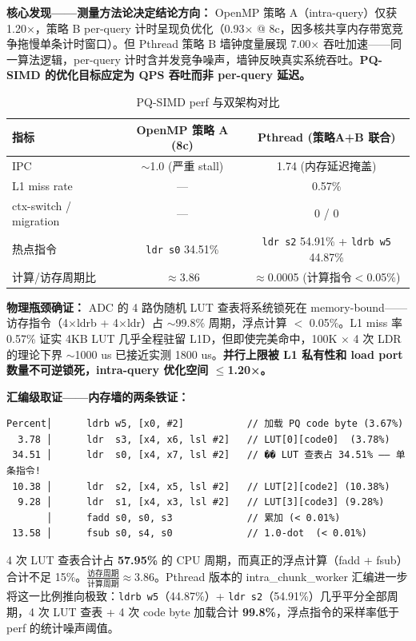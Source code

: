 \documentclass[UTF8,a4paper,10pt]{ctexart}
\begin{document}
\textbf{核心发现——测量方法论决定结论方向：} OpenMP 策略 A（intra-query）仅获 1.20×，策略 B per-query 计时呈现负优化（0.93× @ 8c，因多核共享内存带宽竞争拖慢单条计时窗口）。但 Pthread 策略 B 墙钟度量展现 7.00× 吞吐加速——同一算法逻辑，per-query 计时含并发竞争噪声，墙钟反映真实系统吞吐。\textbf{PQ-SIMD 的优化目标应定为 QPS 吞吐而非 per-query 延迟。}

\begin{table}[H]
\centering
\caption{PQ-SIMD perf 与双架构对比}
\begin{tabular}{lcc}
\hline
指标 & OpenMP 策略 A (8c) & Pthread (策略A+B 联合) \\
\hline
IPC & $\sim$1.0 (严重 stall) & 1.74 (内存延迟掩盖) \\
L1 miss rate & — & 0.57\% \\
ctx-switch / migration & — & 0 / 0 \\
热点指令 & \texttt{ldr s0} 34.51\% & \texttt{ldr s2} 54.91\% + \texttt{ldrb w5} 44.87\% \\
计算/访存周期比 & $\approx$3.86 & $\approx$0.0005 (计算指令$<$0.05\%) \\
\hline
\end{tabular}
\end{table}

\textbf{物理瓶颈确证：} ADC 的 4 路伪随机 LUT 查表将系统锁死在 memory-bound——访存指令（4×ldrb + 4×ldr）占 $\sim$99.8\% 周期，浮点计算 $<$ 0.05\%。L1 miss 率 0.57\% 证实 4KB LUT 几乎全程驻留 L1D，但即使完美命中，100K $\times$ 4 次 LDR 的理论下界 $\sim$1000 us 已接近实测 1800 us。\textbf{并行上限被 L1 私有性和 load port 数量不可逆锁死，intra-query 优化空间 $\le$1.20×。}

\textbf{汇编级取证——内存墙的两条铁证：}

\begin{lstlisting}[language={[x86masm]Assembler}, caption={OpenMP 策略 A 热点汇编：标量 LUT 查表主导}]
Percent│      ldrb w5, [x0, #2]           // 加载 PQ code byte (3.67%)
  3.78 │      ldr  s3, [x4, x6, lsl #2]   // LUT[0][code0]  (3.78%)
 34.51 │      ldr  s0, [x4, x7, lsl #2]   // �� LUT 查表占 34.51% —— 单条指令!
 10.38 │      ldr  s2, [x4, x5, lsl #2]   // LUT[2][code2] (10.38%)
  9.28 │      ldr  s1, [x4, x3, lsl #2]   // LUT[3][code3] (9.28%)
       │      fadd s0, s0, s3             // 累加 (< 0.01%)
 13.58 │      fsub s0, s4, s0             // 1.0-dot  (< 0.01%)
\end{lstlisting}

4 次 LUT 查表合计占 \textbf{57.95\%} 的 CPU 周期，而真正的浮点计算（fadd + fsub）合计不足 15\%。$\frac{\text{访存周期}}{\text{计算周期}} \approx 3.86$。Pthread 版本的 intra\_chunk\_worker 汇编进一步将这一比例推向极致：\texttt{ldrb w5}（44.87\%）+ \texttt{ldr s2}（54.91\%）几乎平分全部周期，4 次 LUT 查表 + 4 次 code byte 加载合计 \textbf{99.8\%}，浮点指令的采样率低于 perf 的统计噪声阈值。
\end{document}
